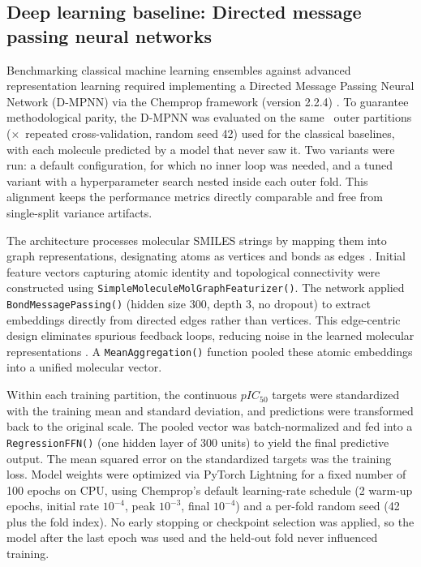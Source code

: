 \subsection{Deep learning baseline: Directed message passing neural networks}
\label{sec:materials_gnn}

Benchmarking classical machine learning ensembles against advanced representation learning required implementing a Directed Message Passing Neural Network (D-MPNN) via the Chemprop framework (version 2.2.4) \cite{graff2026, yang2019}. To guarantee methodological parity, the D-MPNN was evaluated on the same \TotalOuterFolds\ outer partitions (\OuterRepeats$\times$\OuterKFolds\ repeated cross-validation, random seed 42) used for the classical baselines, with each molecule predicted by a model that never saw it. Two variants were run: a default configuration, for which no inner loop was needed, and a tuned variant with a hyperparameter search nested inside each outer fold. This alignment keeps the performance metrics directly comparable and free from single-split variance artifacts.

The architecture processes molecular SMILES strings by mapping them into graph representations, designating atoms as vertices and bonds as edges \cite{heid2024}. Initial feature vectors capturing atomic identity and topological connectivity were constructed using \texttt{SimpleMoleculeMolGraphFeaturizer()}. The network applied \texttt{BondMessagePassing()} (hidden size 300, depth 3, no dropout) to extract embeddings directly from directed edges rather than vertices. This edge-centric design eliminates spurious feedback loops, reducing noise in the learned molecular representations \cite{yang2019}. A \texttt{MeanAggregation()} function pooled these atomic embeddings into a unified molecular vector.

Within each training partition, the continuous $pIC_{50}$ targets were standardized with the training mean and standard deviation, and predictions were transformed back to the original scale. The pooled vector was batch-normalized and fed into a \texttt{RegressionFFN()} (one hidden layer of 300 units) to yield the final predictive output. The mean squared error on the standardized targets was the training loss. Model weights were optimized via PyTorch Lightning for a fixed number of 100 epochs on CPU, using Chemprop's default learning-rate schedule (2 warm-up epochs, initial rate $10^{-4}$, peak $10^{-3}$, final $10^{-4}$) and a per-fold random seed (42 plus the fold index). No early stopping or checkpoint selection was applied, so the model after the last epoch was used and the held-out fold never influenced training.

